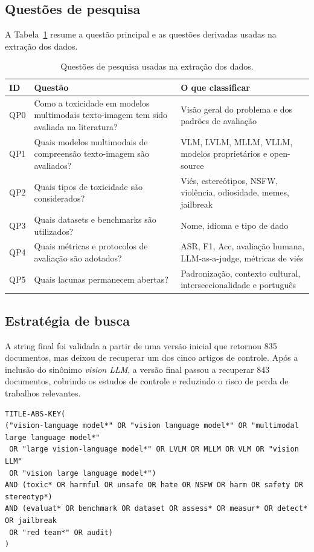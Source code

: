 \documentclass[12pt]{article}
\begin{document}
\subsection{Questões de pesquisa}

A Tabela~\ref{tab:qp} resume a questão principal e as questões derivadas usadas na extração dos dados.

\begin{table}[ht]
\centering
\small
\begin{tabular}{p{1.1cm}p{6.8cm}p{5.0cm}}
\hline
{\bfseries ID} & {\bfseries Questão} & {\bfseries O que classificar} \\
\hline
QP0 & Como a toxicidade em modelos multimodais texto-imagem tem sido avaliada na literatura? & Visão geral do problema e dos padrões de avaliação \\
QP1 & Quais modelos multimodais de compreensão texto-imagem são avaliados? & VLM, LVLM, MLLM, VLLM, modelos proprietários e open-source \\
QP2 & Quais tipos de toxicidade são considerados? & Viés, estereótipos, NSFW, violência, odiosidade, memes, jailbreak \\
QP3 & Quais datasets e benchmarks são utilizados? & Nome, idioma e tipo de dado \\
QP4 & Quais métricas e protocolos de avaliação são adotados? & ASR, F1, Acc, avaliação humana, LLM-as-a-judge, métricas de viés \\
QP5 & Quais lacunas permanecem abertas? & Padronização, contexto cultural, interseccionalidade e português \\
\hline
\end{tabular}
\caption{Questões de pesquisa usadas na extração dos dados.}
\label{tab:qp}
\end{table}

\subsection{Estratégia de busca}

A string final foi validada a partir de uma versão inicial que retornou 835 documentos, mas deixou de recuperar um dos cinco artigos de controle. Após a inclusão do sinônimo \textit{vision LLM}, a versão final passou a recuperar 843 documentos, cobrindo os estudos de controle e reduzindo o risco de perda de trabalhos relevantes.

\small
\begin{verbatim}
TITLE-ABS-KEY(
("vision-language model*" OR "vision language model*" OR "multimodal large language model*"
 OR "large vision-language model*" OR LVLM OR MLLM OR VLM OR "vision LLM"
 OR "vision large language model*")
AND (toxic* OR harmful OR unsafe OR hate OR NSFW OR harm OR safety OR stereotyp*)
AND (evaluat* OR benchmark OR dataset OR assess* OR measur* OR detect* OR jailbreak
 OR "red team*" OR audit)
)
\end{verbatim}
\normalsize
\end{document}
